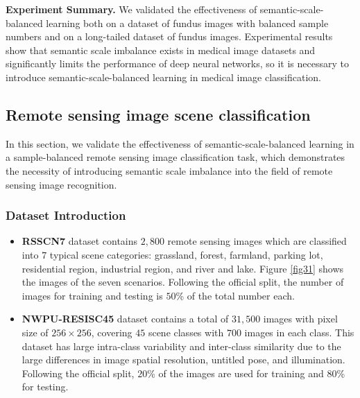 \documentclass[10pt]{article} %
\begin{document}
\textbf{Experiment Summary.} We validated the effectiveness of semantic-scale-balanced learning both on a dataset of fundus images with balanced sample numbers and on a long-tailed dataset of fundus images. Experimental results show that semantic scale imbalance exists in medical image datasets and significantly limits the performance of deep neural networks, so it is necessary to introduce semantic-scale-balanced learning in medical image classification.




\subsection{Remote sensing image scene classification\label{B.7}}

In this section, we validate the effectiveness of semantic-scale-balanced learning in a sample-balanced remote sensing image classification task, which demonstrates the necessity of introducing semantic scale imbalance into the field of remote sensing image recognition.

\subsubsection{Dataset Introduction}

\begin{itemize}
\item \textbf{RSSCN7} dataset contains $2,800$ remote sensing images which are classified into $7$ typical scene categories: grassland, forest, farmland, parking lot, residential region, industrial region, and river and lake. Figure \ref{fig31} shows the images of the seven scenarios. Following the official split, the number of images for training and testing is $50$\% of the total number each.

\item \textbf{NWPU-RESISC45} dataset contains a total of $31,500$ images with pixel size of $256\times256$, covering $45$ scene classes with $700$ images in each class. This dataset has large intra-class variability and inter-class similarity due to the large differences in image spatial resolution, untitled pose, and illumination. Following the official split, $20$\% of the images are used for training and $80$\% for testing.
\end{itemize}
\end{document}
